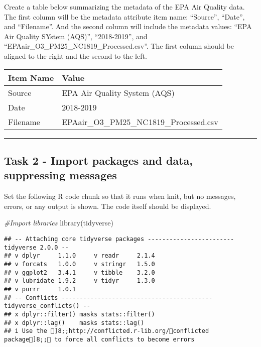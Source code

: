 \documentclass[
]{article}
\newenvironment{Shaded}{\begin{snugshade}}{\end{snugshade}}
\newcommand{\CommentTok}[1]{\textcolor[rgb]{0.56,0.35,0.01}{\textit{#1}}}
\newcommand{\FunctionTok}[1]{\textcolor[rgb]{0.00,0.00,0.00}{#1}}
\newcommand{\NormalTok}[1]{#1}
\begin{document}
Create a table below summarizing the metadata of the EPA Air Quality
data. The first column will be the metadata attribute item name:
``Source'', ``Date'', and ``Filename''. And the second column will
include the metadata values: ``EPA Air Quality SYstem (AQS)'',
``2018-2019'', and ``EPAair\_O3\_PM25\_NC1819\_Processed.csv''. The
first column should be aligned to the right and the second to the left.

\begin{longtable}[]{@{}ll@{}}
\toprule()
Item Name & Value \\
\midrule()
\endhead
Source & EPA Air Quality System (AQS) \\
Date & 2018-2019 \\
Filename & EPAair\_O3\_PM25\_NC1819\_Processed.csv \\
\bottomrule()
\end{longtable}

\begin{center}\rule{0.5\linewidth}{0.5pt}\end{center}

\hypertarget{task-2---import-packages-and-data-suppressing-messages}{%
\subsection{Task 2 - Import packages and data, suppressing
messages}\label{task-2---import-packages-and-data-suppressing-messages}}

Set the following R code chunk so that it runs when knit, but no
messages, errors, or any output is shown. The code itself should be
displayed.

\begin{Shaded}
\begin{Highlighting}[]
\CommentTok{\#Import libraries}
\FunctionTok{library}\NormalTok{(tidyverse)}
\end{Highlighting}
\end{Shaded}

\begin{verbatim}
## -- Attaching core tidyverse packages ------------------------ tidyverse 2.0.0 --
## v dplyr     1.1.0     v readr     2.1.4
## v forcats   1.0.0     v stringr   1.5.0
## v ggplot2   3.4.1     v tibble    3.2.0
## v lubridate 1.9.2     v tidyr     1.3.0
## v purrr     1.0.1     
## -- Conflicts ------------------------------------------ tidyverse_conflicts() --
## x dplyr::filter() masks stats::filter()
## x dplyr::lag()    masks stats::lag()
## i Use the ]8;;http://conflicted.r-lib.org/conflicted package]8;; to force all conflicts to become errors
\end{verbatim}
\end{document}
